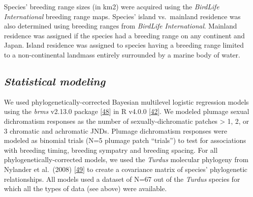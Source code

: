 \documentclass[
  a4paper,
]{article}
\begin{document}
Species' breeding range sizes (in km2) were acquired using the
\emph{BirdLife International} breeding range maps. Species' island
vs.~mainland residence was also determined using breeding ranges from
\emph{BirdLife International}. Mainland residence was assigned if the
species had a breeding range on any continent and Japan. Island
residence was assigned to species having a breeding range limited to a
non-continental landmass entirely surrounded by a marine body of water.

\hypertarget{statistical-modeling}{%
\subsection{\texorpdfstring{\emph{Statistical
modeling}}{Statistical modeling}}\label{statistical-modeling}}

We used phylogenetically-corrected Bayesian multilevel logistic
regression models using the \emph{brms} v2.13.0 package
{[}\protect\hyperlink{ref-burkner2017}{48}{]} in R v4.0.0
{[}\protect\hyperlink{ref-rcoreteam2020}{42}{]}⁠. We modeled plumage
sexual dichromatism responses as the number of sexually-dichromatic
patches \textgreater{} 1, 2, or 3 chromatic and achromatic JNDs. Plumage
dichromatism responses were modeled as binomial trials (N=5 plumage
patch ``trials'') to test for associations with breeding timing,
breeding sympatry and breeding spacing. For all
phylogenetically-corrected models, we used the \emph{Turdus} molecular
phylogeny from Nylander et al.~(2008)
{[}\protect\hyperlink{ref-nylander2008}{49}{]} to create a covariance
matrix of species' phylogenetic relationships. All models used a dataset
of N=67 out of the \emph{Turdus} species for which all the types of data
(see above) were available.
\end{document}
